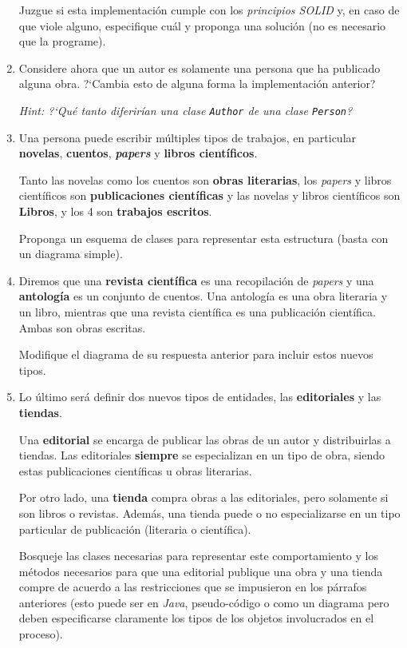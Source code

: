 \begin{Exercise}[title={Publicaciones}]
\begin{enumerate}
        Juzgue si esta implementación cumple con los \textit{principios SOLID} y, en caso
        de que viole alguno, especifique cuál y proponga una solución (no es necesario 
        que la programe).

      \item Considere ahora que un autor es solamente una persona que ha publicado alguna 
        obra.
        ?`Cambia esto de alguna forma la implementación anterior?

        \textit{Hint: ?`Qué tanto diferirían una clase \texttt{Author} de una clase 
        \texttt{Person}?}
      
      \item Una persona puede escribir múltiples tipos de trabajos, en particular 
        \textbf{novelas}, \textbf{cuentos}, \textbf{\textit{papers}} y \textbf{libros 
        científicos}.

        Tanto las novelas como los cuentos son \textbf{obras literarias}, los 
        \textit{papers} y libros científicos son \textbf{publicaciones científicas} y las 
        novelas y libros científicos son \textbf{Libros}, y los 4 son \textbf{trabajos 
        escritos}.

        Proponga un esquema de clases para representar esta estructura (basta con un 
        diagrama simple).

      
      \item Diremos que una \textbf{revista científica} es una recopilación de 
        \textit{papers} y una \textbf{antología} es un conjunto de cuentos.
        Una antología es una obra literaria y un libro, mientras que una revista 
        científica es una publicación científica.
        Ambas son obras escritas.

        Modifique el diagrama de su respuesta anterior para incluir estos nuevos tipos.
      
      \item Lo último será definir dos nuevos tipos de entidades, las \textbf{editoriales}
        y las \textbf{tiendas}.

        Una \textbf{editorial} se encarga de publicar las obras de un autor y 
        distribuirlas a tiendas.
        Las editoriales \textbf{siempre} se especializan en un tipo de obra, siendo estas
        publicaciones científicas u obras literarias.

        Por otro lado, una \textbf{tienda} compra obras a las editoriales, pero solamente 
        si son libros o revistas.
        Además, una tienda puede o no especializarse en un tipo particular de publicación
        (literaria o científica).

        Bosqueje las clases necesarias para representar este comportamiento y los métodos 
        necesarios para que una editorial publique una obra y una tienda compre de acuerdo 
        a las restricciones que se impusieron en los párrafos anteriores (esto puede ser 
        en \textit{Java}, pseudo-código o como un diagrama pero deben especificarse 
        claramente los tipos de los objetos involucrados en el proceso).
    \end{enumerate}
  \end{Exercise}

